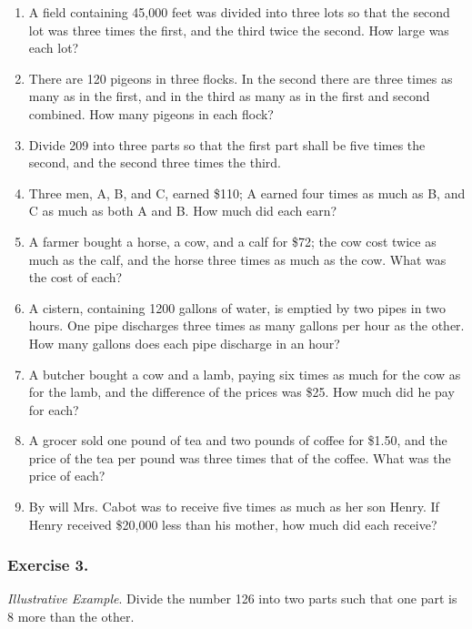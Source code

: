 \documentclass{book}
\begin{document}
\begin{enumerate}
\item A field containing 45,000 feet was divided into three
lots so that the second lot was three times the first, and
the third twice the second. How large was each lot?

\item There are 120 pigeons in three flocks. In the second
there are three times as many as in the first, and in the
third as many as in the first and second combined. How
many pigeons in each flock?

\item Divide 209 into three parts so that the first part
shall be five times the second, and the second three times
the third.

\item Three men, A, B, and C, earned \$110; A earned
four times as much as B, and C as much as both A and B.
How much did each earn?

\item A farmer bought a horse, a cow, and a calf for \$72; the cow
cost twice as much as the calf, and the horse three times as much
as the cow. What was the cost of each?

\item A cistern, containing 1200 gallons of water, is emptied by
two pipes in two hours. One pipe discharges three times as many
gallons per hour as the other. How many gallons does each pipe
discharge in an hour?

\item A butcher bought a cow and a lamb, paying six times as much
for the cow as for the lamb, and the difference of the prices was
\$25. How much did he pay for each?

\item A grocer sold one pound of tea and two pounds of coffee for
\$1.50, and the price of the tea per pound was three times that of
the coffee. What was the price of each?

\item By will Mrs. Cabot was to receive five times as much as her
son Henry. If Henry received \$20,000 less than his mother, how
much did each receive?
\end{enumerate}

\subsubsection*{Exercise 3.}

\textit{ Illustrative Example}. Divide the number 126 into two
parts such that one part is 8 more than the other.
\end{document}
